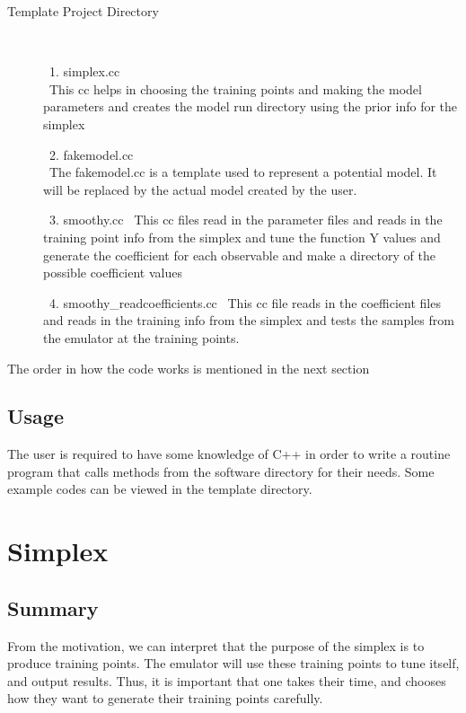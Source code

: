\documentclass[12pt]{article}
\numberwithin{equation}{section}
\numberwithin{figure}{section}
\begin{document}
\begin{description}
\item[Template Project Directory] \

\ 1. simplex.cc \\
\ This cc helps in choosing the training points and making the model parameters and creates the model run directory using the prior info for the simplex 

\ 2. fakemodel.cc \\
\ The fakemodel.cc is a template used to represent a potential model. It will be replaced by the actual model created by the user. 

\ 3. smoothy.cc 
\ This cc files read in the parameter files and reads in the training point info from the simplex and tune the function Y values and generate the coefficient for each observable and make a directory of the possible coefficient values 

\ 4. smoothy\_readcoefficients.cc 
\ This cc file reads in the coefficient files and reads in the training info from the simplex and tests the samples from the emulator at the training points. 

\end{description}

The order in how the code works is mentioned in the next section 


\subsection{Usage}
\label{sec:Usage}

The user is required to have some knowledge of C++ in order to write a routine program that calls methods from the software directory for their needs. Some example codes can be viewed in the template directory.

\section{Simplex}

\subsection{Summary}
From the motivation, we can interpret that the purpose of the simplex is to produce training points. The emulator will use these training points to tune itself, and output results. Thus, it is important that one takes their time, and chooses how they want to generate their training points carefully.
\end{document}
